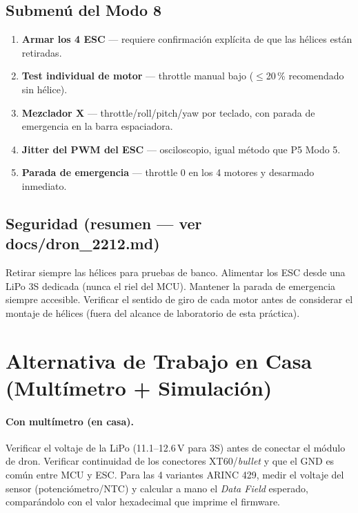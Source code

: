 \documentclass[11pt]{article}
\begin{document}
\subsection{Submenú del Modo 8}
\begin{enumerate}
  \item \textbf{Armar los 4 ESC} — requiere confirmación explícita de que las hélices
        están retiradas.
  \item \textbf{Test individual de motor} — throttle manual bajo (\(\le\)20\,\%
        recomendado sin hélice).
  \item \textbf{Mezclador X} — throttle/roll/pitch/yaw por teclado, con parada de
        emergencia en la barra espaciadora.
  \item \textbf{Jitter del PWM del ESC} — osciloscopio, igual método que P5 Modo 5.
  \item \textbf{Parada de emergencia} — throttle 0 en los 4 motores y desarmado
        inmediato.
\end{enumerate}

\subsection{Seguridad (resumen — ver docs/dron\_2212.md)}
Retirar siempre las hélices para pruebas de banco. Alimentar los ESC desde una LiPo 3S
dedicada (nunca el riel del MCU). Mantener la parada de emergencia siempre accesible.
Verificar el sentido de giro de cada motor antes de considerar el montaje de hélices
(fuera del alcance de laboratorio de esta práctica).

\section{Alternativa de Trabajo en Casa (Multímetro + Simulación)}
\label{sec:casa}

\paragraph{Con multímetro (en casa).} Verificar el voltaje de la LiPo (11.1--12.6\,V
para 3S) antes de conectar el módulo de dron. Verificar continuidad de los conectores
XT60/\emph{bullet} y que el GND es común entre MCU y ESC. Para las 4 variantes
ARINC 429, medir el voltaje del sensor (potenciómetro/NTC) y calcular a mano el
\emph{Data Field} esperado, comparándolo con el valor hexadecimal que imprime el
firmware.
\end{document}
